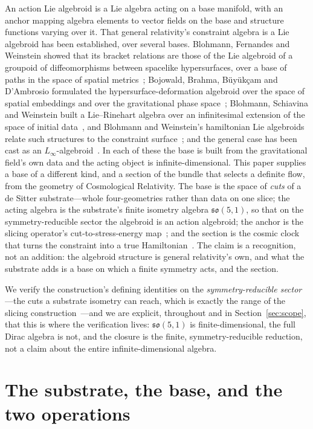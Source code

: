 \documentclass[11pt,a4paper]{article}
\theoremstyle{plain}
\theoremstyle{definition}
\theoremstyle{remark}
\newcommand{\so}{\mathfrak{so}}
\begin{document}
An action Lie algebroid is a Lie algebra acting on a base manifold, with an anchor mapping algebra elements to vector fields on the base and structure functions varying over it. That general relativity's constraint algebra is a Lie algebroid has been established, over several bases. Blohmann, Fernandes and Weinstein showed that its bracket relations are those of the Lie algebroid of a groupoid of diffeomorphisms between spacelike hypersurfaces, over a base of paths in the space of spatial metrics~\cite{BFW2013}; Bojowald, Brahma, B\"uy\"uk\c{c}am and D'Ambrosio formulated the hypersurface-deformation algebroid over the space of spatial embeddings and over the gravitational phase space~\cite{BBBD2016}; Blohmann, Schiavina and Weinstein built a Lie--Rinehart algebra over an infinitesimal extension of the space of initial data~\cite{BSW2022}, and Blohmann and Weinstein's hamiltonian Lie algebroids relate such structures to the constraint surface~\cite{BW2018}; and the general case has been cast as an $L_\infty$-algebroid~\cite{BDS2024}. In each of these the base is built from the gravitational field's own data and the acting object is infinite-dimensional. This paper supplies a base of a different kind, and a section of the bundle that selects a definite flow, from the geometry of Cosmological Relativity. The base is the space of \emph{cuts} of a de Sitter substrate---whole four-geometries rather than data on one slice; the acting algebra is the substrate's finite isometry algebra $\so(5,1)$, so that on the symmetry-reducible sector the algebroid is an action algebroid; the anchor is the slicing operator's cut-to-stress-energy map~\cite{JanzenOperator}; and the section is the cosmic clock that turns the constraint into a true Hamiltonian~\cite{JanzenCanonicalTime}. The claim is a recognition, not an addition: the algebroid structure is general relativity's own, and what the substrate adds is a base on which a finite symmetry acts, and the section.

We verify the construction's defining identities on the \emph{symmetry-reducible sector}---the cuts a substrate isometry can reach, which is exactly the range of the slicing construction~\cite{JanzenRange}---and we are explicit, throughout and in Section~\ref{sec:scope}, that this is where the verification lives: $\so(5,1)$ is finite-dimensional, the full Dirac algebra is not, and the closure is the finite, symmetry-reducible reduction, not a claim about the entire infinite-dimensional algebra.

\section{The substrate, the base, and the two operations}\label{sec:substrate}
\end{document}
